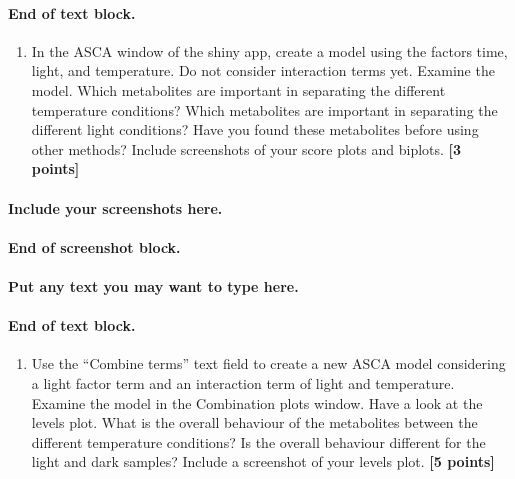 \documentclass[
]{article}
\providecommand{\tightlist}{%
  \setlength{\itemsep}{0pt}\setlength{\parskip}{0pt}}
\begin{document}
\hypertarget{end-of-text-block.-35}{%
\paragraph{End of text block.}\label{end-of-text-block.-35}}

\begin{enumerate}
\def\labelenumi{\Alph{enumi})}
\setcounter{enumi}{2}
\tightlist
\item
  In the ASCA window of the shiny app, create a model using the factors
  time, light, and temperature. Do not consider interaction terms yet.
  Examine the model. Which metabolites are important in separating the
  different temperature conditions? Which metabolites are important in
  separating the different light conditions? Have you found these
  metabolites before using other methods? Include screenshots of your
  score plots and biplots. \textbf{{[}3 points{]}}
\end{enumerate}

\hypertarget{include-your-screenshots-here.-2}{%
\paragraph{\texorpdfstring{Include your screenshots here.\\
}{Include your screenshots here. }}\label{include-your-screenshots-here.-2}}

\hypertarget{end-of-screenshot-block.-2}{%
\paragraph{\texorpdfstring{End of screenshot block.\\
}{End of screenshot block. }}\label{end-of-screenshot-block.-2}}

\hfill\break

\hypertarget{put-any-text-you-may-want-to-type-here.-34}{%
\paragraph{Put any text you may want to type
here.}\label{put-any-text-you-may-want-to-type-here.-34}}

\hypertarget{end-of-text-block.-36}{%
\paragraph{End of text block.}\label{end-of-text-block.-36}}

\begin{enumerate}
\def\labelenumi{\Alph{enumi})}
\setcounter{enumi}{3}
\tightlist
\item
  Use the ``Combine terms'' text field to create a new ASCA model
  considering a light factor term and an interaction term of light and
  temperature. Examine the model in the Combination plots window. Have a
  look at the levels plot. What is the overall behaviour of the
  metabolites between the different temperature conditions? Is the
  overall behaviour different for the light and dark samples? Include a
  screenshot of your levels plot. \textbf{{[}5 points{]}}
\end{enumerate}
\end{document}
